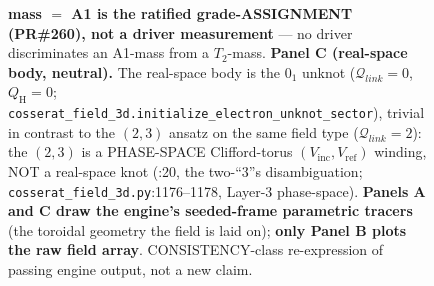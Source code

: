 \begin{figure}[htbp]
{\textbf{mass $=$ A1 is the ratified grade-ASSIGNMENT (PR\#260), not a driver
measurement} --- no driver discriminates an A1-mass from a $T_2$-mass.
\textbf{Panel C (real-space body, neutral).} The real-space body is the $0_1$
unknot ($\mathcal{Q}_{link}=0$, $Q_{\mathrm H}=0$;
\texttt{cosserat\_field\_3d.initialize\_electron\_unknot\_sector}), trivial in
contrast to the $(2,3)$ ansatz on the same field type ($\mathcal{Q}_{link}=2$):
the $(2,3)$ is a PHASE-SPACE Clifford-torus $(V_{\mathrm{inc}},V_{\mathrm{ref}})$
winding, NOT a real-space knot
(:20,
the two-``3''s disambiguation; \texttt{cosserat\_field\_3d.py}:1176--1178,
Layer-3 phase-space). \textbf{Panels A and C draw the engine's seeded-frame
parametric tracers} (the toroidal geometry the field is laid on); \textbf{only
Panel B plots the raw field array}. CONSISTENCY-class re-expression of passing
engine output, not a new claim.}
\label{fig:vol9_two_natured_electron}
\end{figure}
